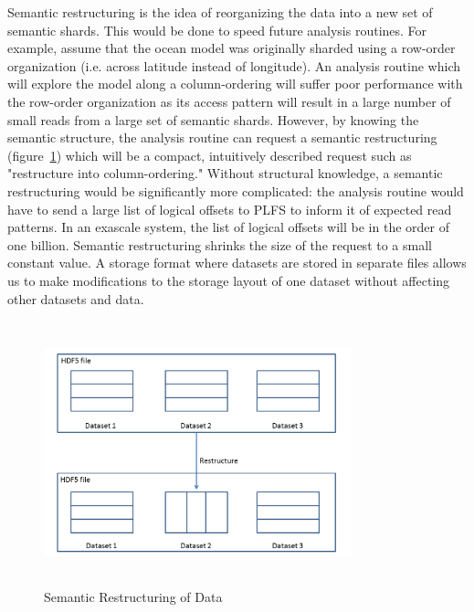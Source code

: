 Semantic restructuring is the idea of reorganizing the data into a new set of semantic shards.  This would be done to speed future analysis routines.  For example, assume that the ocean model was originally sharded using a row-order organization (i.e. across latitude instead of longitude).  An analysis routine which will explore the model along a column-ordering will suffer poor performance with the row-order organization as its access pattern will result in a large number of small reads from a large set of semantic shards.  However, by knowing the semantic structure, the analysis routine can request a semantic restructuring (figure~\ref{semantic_restructuring}) which will be a compact, intuitively described request such as "restructure into column-ordering."  Without structural knowledge, a semantic restructuring would be significantly more complicated: the analysis routine would have to send a large list of logical offsets to PLFS to inform it of expected read patterns.  In an exascale system, the list of logical offsets will be in the order of one billion.  Semantic restructuring shrinks the size of the request to a small constant value. A storage format where datasets are stored in separate files allows us to make modifications to the storage layout of one dataset without affecting other datasets and data.

\begin{figure}[!t]
\centering
\includegraphics[width=3.5in,height=3.0in]{semantic_restructuring}
\caption{Semantic Restructuring of Data}
\label{semantic_restructuring}
\end{figure}



